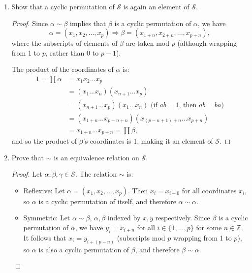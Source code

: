 \documentclass{article}
\begin{document}
\begin{enumerate}[label=(\alph*), itemsep=0em, start=2]
    \item Show that a cyclic permutation of $\mathcal{S}$ is again an element of $\mathcal{S}$.
          \begin{proof}
            Since $\alpha \sim \beta$ implies that $\beta$ is a cyclic permutation of $\alpha$, we have
            \begin{equation*}
                \alpha = (x_1, x_2, ..., x_p) \Rightarrow \beta = (x_{1 + n}, x_{2 + n}, ..., x_{p + n}),
            \end{equation*}
            where the subscripts of elements of $\beta$ are taken mod $p$ (although wrapping from 1 to $p$, rather than 0 to $p - 1$).

            The product of the coordinates of $\alpha$ is:
            \begin{align*}
                1 = \prod \alpha &= x_1 x_2 ... x_p \\
                &= (x_1 ... x_n)(x_{n + 1} ... x_p) \\
                &= (x_{n + 1} ... x_p)(x_1 ... x_n) \text{ (if $ab = 1$, then $ab = ba$)} \\
                &= (x_{1 + n} ... x_{p - n + n})(x_{(p - n + 1) + n} ... x_{p + n}) \\
                &= x_{1 + n} ... x_{p + n} = \prod \beta,
            \end{align*}
            and so the product of $\beta$'s coordinates is 1, making it an element of $\mathcal{S}$.
          \end{proof}
    \item Prove that $\sim$ is an equivalence relation on $\mathcal{S}$.
          \begin{proof}
            Let $\alpha, \beta, \gamma \in \mathcal{S}$. The relation $\sim$ is:
            \begin{itemize}[itemsep=0em]
                \item Reflexive: Let $\alpha = (x_1, x_2, ..., x_p)$. Then $x_i = x_{i + 0}$ for all coordinates $x_i$, so $\alpha$ is a cyclic permutation of itself, and therefore $\alpha \sim \alpha$.
                \item Symmetric: Let $\alpha \sim \beta$, $\alpha, \beta$ indexed by $x, y$ respectively. Since $\beta$ is a cyclic permutation of $\alpha$, we have $y_i = x_{i + n}$ for all $i \in \{ 1, ..., p \}$ for some $n \in \mathbb{Z}$. It follows that $x_i = y_{i + (p - n)}$ (subscripts mod $p$ wrapping from 1 to $p$), so $\alpha$ is also a cyclic permutation of $\beta$, and therefore $\beta \sim \alpha$.

\end{itemize}
\end{proof}
\end{enumerate}
\end{document}

